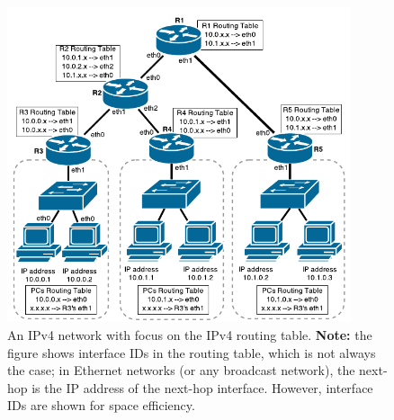 \documentclass[pdftex,12pt,a4paper]{article}
\begin{document}
            \begin{figure}[tbh]
                \centering
                \includegraphics[width=0.9\textwidth]{figures/cidr}
                \caption{An IPv4 network with focus on the IPv4 routing table.
                \textbf{Note:} the figure shows interface IDs in the
                routing table, which is not always the case; in Ethernet
                networks (or any broadcast network), the next-hop is the IP address
                of the next-hop interface. However, interface IDs are shown for
                space efficiency.}
                \label{fig:cidr}
            \end{figure}
\end{document}
